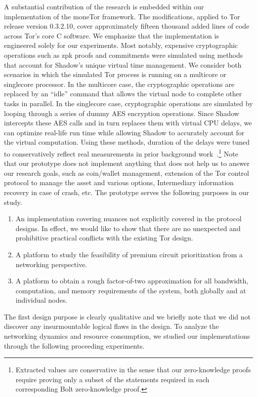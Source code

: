 A substantial contribution of the research is embedded within our implementation
of the moneTor framework. The modifications, applied to Tor release version
0.3.2.10, cover approximately fifteen thousand added lines of code across Tor's
core C software. We emphasize that the implementation is engineered solely for
our experiments. Most notably, expensive cryptographic operations such as zpk
proofs and commitments were simulated using methods that account for Shadow's
unique virtual time management. We consider both scenarios in which the
simulated Tor process is running on a multicore or singlecore processor. In the
multicore case, the cryptographic operations are replaced by an ``idle'' command
that allows the virtual node to complete other tasks in parallel. In the
singlecore case, cryptographic operations are simulated by looping through a
series of dummy AES encryption operations. Since Shadow intercepts these AES
calls and in turn replaces them with virtual CPU delays, we can optimize
real-life run time while allowing Shadow to accurately account for the virtual
computation. Using these methods, duration of the delays were tuned to
conservatively reflect real measurements in prior background
work~\cite{green2017bolt}.\footnote{Extracted values are conservative in the
  sense that our zero-knowledge proofs require proving only a subset of the
  statements required in each corresponding Bolt zero-knowledge proof.}  Note
that our prototype does not implement anything that does not help us to answer
our research goals, such as coin/wallet management, extension of the Tor control
protocol to manage the asset and various options, Intermediary information
recovery in case of crash, etc. The prototype serves the following purposes in
our study.
\begin{enumerate}
\item An implementation covering nuances not explicitly
  covered in the protocol designs. In effect, we would like to show that there
  are no unexpected and prohibitive practical conflicts with the existing Tor
  design.
\item A platform to study the feasibility of premium circuit
  prioritization from a networking perspective.
\item A platform to obtain a rough factor-of-two approximation for all
  bandwidth, computation, and memory requirements of the system, both globally
  and at individual nodes.
\end{enumerate}

The first design purpose is clearly qualitative and we briefly note that we did
not discover any insurmountable logical flaws in the design. To analyze the
networking dynamics and resource consumption, we studied our implementations
through the following proceeding experiments.

